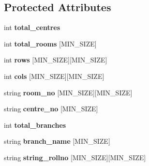 \subsection*{Protected Attributes}
\begin{DoxyCompactItemize}
\item 
\hypertarget{classReadInput_ae6cb9c2ac41252a1663e1a270e5604cf}{int {\bfseries total\-\_\-centres}}\label{classReadInput_ae6cb9c2ac41252a1663e1a270e5604cf}

\item 
\hypertarget{classReadInput_aadf185ba59fa4eebe766a1a428069d4e}{int {\bfseries total\-\_\-rooms} \mbox{[}M\-I\-N\-\_\-\-S\-I\-Z\-E\mbox{]}}\label{classReadInput_aadf185ba59fa4eebe766a1a428069d4e}

\item 
\hypertarget{classReadInput_a68efb5b99591aa2e38e2cc121755fb7a}{int {\bfseries rows} \mbox{[}M\-I\-N\-\_\-\-S\-I\-Z\-E\mbox{]}\mbox{[}M\-I\-N\-\_\-\-S\-I\-Z\-E\mbox{]}}\label{classReadInput_a68efb5b99591aa2e38e2cc121755fb7a}

\item 
\hypertarget{classReadInput_aa9c1897e3bad92ae588d77fa3b16ecb5}{int {\bfseries cols} \mbox{[}M\-I\-N\-\_\-\-S\-I\-Z\-E\mbox{]}\mbox{[}M\-I\-N\-\_\-\-S\-I\-Z\-E\mbox{]}}\label{classReadInput_aa9c1897e3bad92ae588d77fa3b16ecb5}

\item 
\hypertarget{classReadInput_a6d9af93427362e837719f7526c96df59}{string {\bfseries room\-\_\-no} \mbox{[}M\-I\-N\-\_\-\-S\-I\-Z\-E\mbox{]}\mbox{[}M\-I\-N\-\_\-\-S\-I\-Z\-E\mbox{]}}\label{classReadInput_a6d9af93427362e837719f7526c96df59}

\item 
\hypertarget{classReadInput_afb51af3f02f051356b03a307a98fd88b}{string {\bfseries centre\-\_\-no} \mbox{[}M\-I\-N\-\_\-\-S\-I\-Z\-E\mbox{]}}\label{classReadInput_afb51af3f02f051356b03a307a98fd88b}

\item 
\hypertarget{classReadInput_a764c6262e26824e6d863d85ef605a911}{int {\bfseries total\-\_\-branches}}\label{classReadInput_a764c6262e26824e6d863d85ef605a911}

\item 
\hypertarget{classReadInput_ab7d418f9c67111dcf92bd59281c3f1ca}{string {\bfseries branch\-\_\-name} \mbox{[}M\-I\-N\-\_\-\-S\-I\-Z\-E\mbox{]}}\label{classReadInput_ab7d418f9c67111dcf92bd59281c3f1ca}

\item 
\hypertarget{classReadInput_a5f72eb01b88a6936ea44583d0fea9999}{string {\bfseries string\-\_\-rollno} \mbox{[}M\-I\-N\-\_\-\-S\-I\-Z\-E\mbox{]}\mbox{[}M\-I\-N\-\_\-\-S\-I\-Z\-E\mbox{]}}\label{classReadInput_a5f72eb01b88a6936ea44583d0fea9999}


\end{DoxyCompactItemize}
